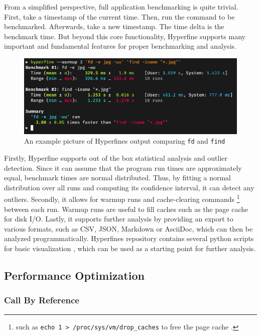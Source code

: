 From a simplified perspective, full application benchmarking is quite trivial. First, take a timestamp of the current time. Then, run the command to be benchmarked. Afterwards, take a new timestamp. The time delta is the benchmark time. But beyond this core functionality, Hyperfine supports many important and fundamental features for proper benchmarking and analysis.\\

\begin{figure}[H]
  \centering
  \includegraphics[width=\textwidth]{./assets/hyperfine.png}
  \caption{An example picture of Hyperfines output comparing \texttt{fd} and \texttt{find} \cite{hyperfine}}
\end{figure}

Firstly, Hyperfine supports out of the box statistical analysis and outlier detection. Since it can assume that the program run times are approximately equal, benchmark times are normal distributed. Thus, by fitting a normal distribution over all runs and computing its confidence interval, it can detect any outliers. Secondly, it allows for warmup runs and cache-clearing commands \footnote{such as \texttt{echo 1 > /proc/sys/vm/drop\_caches} to free the page cache \cite{kernel}.} between each run. Warmup runs are useful to fill caches such as the page cache for disk I/O. Lastly, it supports further analysis by providing an export to various formats, such as CSV, JSON, Markdown or AsciiDoc, which can then be analyzed programmatically. Hyperfines repository contains several python scripts for basic visualization \cite{hyperfinescripts}, which can be used as a starting point for further analysis.

\subsection{Performance Optimization}
\subsubsection{Call By Reference}
